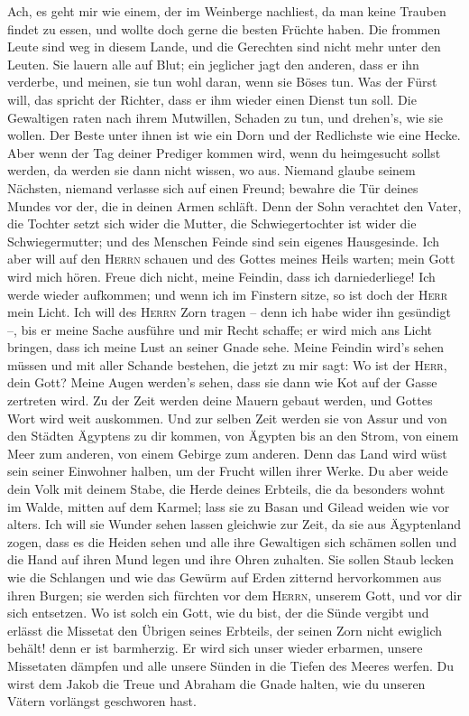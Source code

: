  Ach, es geht mir wie einem, der im Weinberge nachliest,
da man keine Trauben findet zu essen, und wollte doch gerne die besten
Früchte haben.  Die frommen Leute sind weg in diesem
Lande, und die Gerechten sind nicht mehr unter den Leuten. Sie lauern
alle auf Blut; ein jeglicher jagt den anderen, dass er ihn verderbe,
 und meinen, sie tun wohl daran, wenn sie Böses tun. Was
der Fürst will, das spricht der Richter, dass er ihm wieder einen Dienst
tun soll. Die Gewaltigen raten nach ihrem Mutwillen, Schaden zu tun, und
drehen's, wie sie wollen.  Der Beste unter ihnen ist wie
ein Dorn und der Redlichste wie eine Hecke. Aber wenn der Tag deiner
Prediger kommen wird, wenn du heimgesucht sollst werden, da werden sie
dann nicht wissen, wo aus.  Niemand glaube seinem
Nächsten, niemand verlasse sich auf einen Freund; bewahre die Tür deines
Mundes vor der, die in deinen Armen schläft.  Denn der
Sohn verachtet den Vater, die Tochter setzt sich wider die Mutter, die
Schwiegertochter ist wider die Schwiegermutter; und des Menschen Feinde
sind sein eigenes Hausgesinde.  Ich aber will auf den
\textsc{Herrn} schauen und des Gottes meines Heils warten; mein Gott
wird mich hören.  Freue dich nicht, meine Feindin, dass
ich darniederliege! Ich werde wieder aufkommen; und wenn ich im Finstern
sitze, so ist doch der \textsc{Herr} mein Licht.  Ich will
des \textsc{Herrn} Zorn tragen -- denn ich habe wider ihn gesündigt --,
bis er meine Sache ausführe und mir Recht schaffe; er wird mich ans
Licht bringen, dass ich meine Lust an seiner Gnade sehe. 
Meine Feindin wird's sehen müssen und mit aller Schande bestehen, die
jetzt zu mir sagt: Wo ist der \textsc{Herr}, dein Gott? Meine Augen
werden's sehen, dass sie dann wie Kot auf der Gasse zertreten wird.
 Zu der Zeit werden deine Mauern gebaut werden, und
Gottes Wort wird weit auskommen.  Und zur selben Zeit
werden sie von Assur und von den Städten Ägyptens zu dir kommen, von
Ägypten bis an den Strom, von einem Meer zum anderen, von einem Gebirge
zum anderen.  Denn das Land wird wüst sein seiner
Einwohner halben, um der Frucht willen ihrer Werke.  Du
aber weide dein Volk mit deinem Stabe, die Herde deines Erbteils, die da
besonders wohnt im Walde, mitten auf dem Karmel; lass sie zu Basan und
Gilead weiden wie vor alters.  Ich will sie Wunder sehen
lassen gleichwie zur Zeit, da sie aus Ägyptenland zogen, 
dass es die Heiden sehen und alle ihre Gewaltigen sich schämen sollen
und die Hand auf ihren Mund legen und ihre Ohren zuhalten.
 Sie sollen Staub lecken wie die Schlangen und wie das
Gewürm auf Erden zitternd hervorkommen aus ihren Burgen; sie werden sich
fürchten vor dem \textsc{Herrn}, unserem Gott, und vor dir sich
entsetzen.  Wo ist solch ein Gott, wie du bist, der die
Sünde vergibt und erlässt die Missetat den Übrigen seines Erbteils, der
seinen Zorn nicht ewiglich behält! denn er ist barmherzig.
 Er wird sich unser wieder erbarmen, unsere Missetaten
dämpfen und alle unsere Sünden in die Tiefen des Meeres werfen.
 Du wirst dem Jakob die Treue und Abraham die Gnade
halten, wie du unseren Vätern vorlängst geschworen hast.
